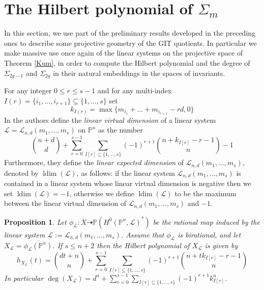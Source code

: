 \documentclass[a4paper,10pt]{amsart}
\newtheorem{Proposition}[thm]{Proposition}
\theoremstyle{definition}
\renewcommand{\P}{\mathbb{P}}
\DeclareMathOperator{\ldim}{ldim}
\begin{document}
\section{The Hilbert polynomial of $\Sigma_m$}\label{degrees}
In this section, we use part of the preliminary results developed in the preceding ones to describe some projective geometry of the GIT quotients. In particular we make massive use once again of the linear systems on the projective space of Theorem \ref{Kum}, in order to compute the Hilbert polynomial and the degree of $\Sigma_{2g-1}$ and $\Sigma_{2g}$ in their natural embeddings in the spaces of invariants. 

For any integer $0\leq r \leq s-1$ and for any multi-index $I(r) = \{i_1,\dots,i_{r+1}\} \subseteq\{1,\dots,s\}$ set
\begin{equation}\label{kdef}
k_{I(r)} = \max\{m_{i_1}+\dots+m_{i_{r+1}}-rd,0\}
\end{equation}
In \cite[Definition 3.2]{BDP16} the authors define the \textit{linear virtual dimension} of a linear system $\mathcal{L}=\mathcal{L}_{n,d}(m_1,\dots,m_s)$ on $\P^n$ as the number
\begin{equation}\label{lexdim}
\binom{n+d}{d}+\sum_{r=0}^{s-1}\sum_{I[r]\subseteq\{1,\dots,s\}}(-1)^{r+1}\binom{n+k_{I[r]}-r-1}{n}-1
\end{equation}
Furthermore, they define the \textit{linear expected dimension} of $\mathcal{L}_{n,d}(m_1,\dots,m_s)$, denoted by $\ldim(\mathcal{L})$, as follows: if the linear system $\mathcal{L}_{n,d}(m_1,\dots,m_s)$ is contained in a linear system whose linear virtual dimension is negative then we set $\ldim(\mathcal{L}) = -1$, otherwise we define $\ldim(\mathcal{L})$ to be the maximum between the linear virtual dimension of $\mathcal{L}_{n,d}(m_1,\dots,m_s)$ and $-1$.
\begin{Proposition}\label{hilbgen}
Let $\phi_{\mathcal{L}}:X\dasharrow\mathbb{P}(H^0(\mathbb{P}^{n},\mathcal{L})^{*})$ be the rational map induced by the linear system $\mathcal{L}:=\mathcal{L}_{n,d}(m_1,\dots,m_s)$. Assume that $\phi_{\mathcal{L}}$ is birational, and let $X_{\mathcal{L}} = \overline{\phi_{\mathcal{L}}(\mathbb{P}^n)}$. If $s\leq n+2$ then the Hilbert polynomial of $X_{\mathcal{L}}$ is given by 
$$h_{X_{\mathcal{L}}}(t) = \binom{dt+n}{n}+\sum_{r=0}^{s-1}\sum_{I[r]\subseteq\{1,\dots,s\}} (-1)^{r+1}\binom{n+tk_{I[r]}-r-1}{n}$$
In particular $\deg(X_{\mathcal{L}})= d^n+\sum_{r=0}^{s-1}\sum_{I[r]\subseteq\{1,\dots,s\}} (-1)^{r+1}k_{I[r]}^n$.
\end{Proposition}
\end{document}
